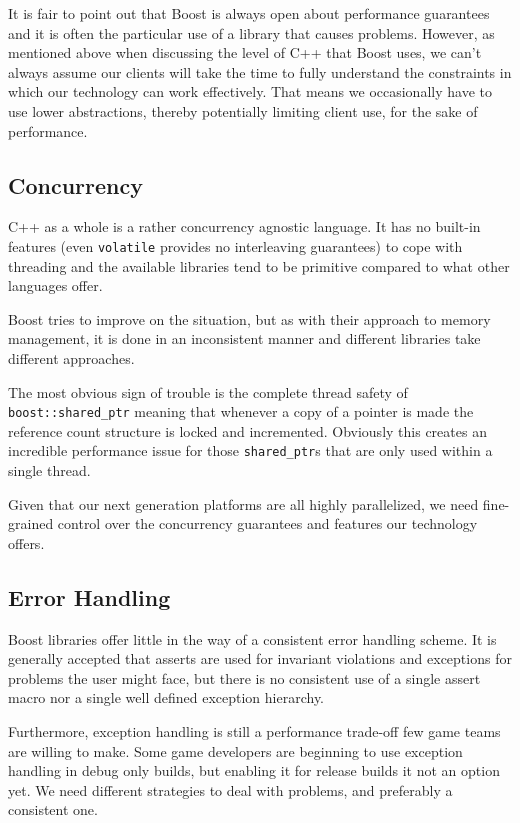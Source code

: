 \documentclass[twocolumn]{paper}
\begin{document}
It is fair to point out that Boost is always open about performance
guarantees and it is often the particular use of a library that
causes problems. However, as mentioned above when discussing the
level of C++ that Boost uses, we can't always assume our clients
will take the time to fully understand the constraints in which our
technology can work effectively. That means we occasionally have to
use lower abstractions, thereby potentially limiting client use, for
the sake of performance.

\subsection{Concurrency}

C++ as a whole is a rather concurrency agnostic language. It has no
built-in features (even \texttt{volatile} provides no interleaving
guarantees) to cope with threading and the available libraries tend
to be primitive compared to what other languages offer.

Boost tries to improve on the situation, but as with their approach
to memory management, it is done in an inconsistent manner and
different libraries take different approaches.

The most obvious sign of trouble is the complete thread safety of
\texttt{boost::shared\_ptr} meaning that whenever a copy of a
pointer is made the reference count structure is locked and
incremented. Obviously this creates an incredible performance issue
for those \texttt{shared\_ptr}s that are only used within a single
thread.

Given that our next generation platforms are all highly
parallelized, we need fine-grained control over the concurrency
guarantees and features our technology offers.

\subsection{Error Handling}

Boost libraries offer little in the way of a consistent error
handling scheme. It is generally accepted that asserts are used for
invariant violations and exceptions for problems the user might
face, but there is no consistent use of a single assert macro nor a
single well defined exception hierarchy.

Furthermore, exception handling is still a performance trade-off few
game teams are willing to make. Some game developers are beginning
to use exception handling in debug only builds, but enabling it for
release builds it not an option yet. We need different strategies to
deal with problems, and preferably a consistent one.
\end{document}
